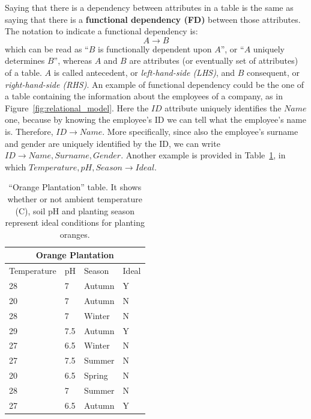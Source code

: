 Saying that there is a dependency between attributes in a table is the same as saying that there is a \textbf{functional dependency (FD)} between those attributes. The notation to indicate a functional dependency is: \[A \rightarrow B\] which can be read as ``\(B\) is functionally dependent upon \(A\)'', or ``\(A\) uniquely determines \(B\)'', whereas \(A\) and \(B\) are attributes (or eventually set of attributes) of a table. \(A\) is called antecedent, or \textit{left-hand-side (LHS)}, and \(B\) consequent, or \textit{right-hand-side (RHS)}. An example of functional dependency could be the one of a table containing the information about the employees of a company, as in Figure~\ref{fig:relational_model}. Here the \(\mathit{ID}\) attribute uniquely identifies the \(\mathit{Name}\) one, because by knowing the employee's ID we can tell what the employee's name is. Therefore, \(\mathit{ID} \rightarrow \mathit{Name}\). More specifically, since also the employee's surname and gender are uniquely identified by the ID, we can write \(\mathit{ID} \rightarrow \mathit{Name}, \mathit{Surname}, \mathit{Gender}\). Another example is provided in Table~\ref{table:orange_plantation}, in which \(\mathit{Temperature}, \mathit{pH}, \mathit{Season} \rightarrow \mathit{Ideal}\).

\begin{table}
\begin{tabular}{|p{2.5cm}|p{2.5cm}|p{2.5cm}|p{2.5cm}|}
\hline
\multicolumn{4}{|c|}{Orange Plantation}\\
\hline
Temperature & pH & Season & Ideal\\
\hline
28 & 7 & Autumn & Y\\
20 & 7 & Autumn & N\\
28 & 7 & Winter & N\\
29 & 7.5 & Autumn & Y\\
27 & 6.5 & Winter & N\\
27 & 7.5 & Summer & N\\
20 & 6.5 & Spring & N\\
28 & 7 & Summer & N\\
27 & 6.5 & Autumn & Y\\
\hline
\end{tabular}
\centering
\caption{``Orange Plantation'' table. It shows whether or not ambient temperature (\textdegree C), soil pH and planting season represent ideal conditions for planting oranges.}
\label{table:orange_plantation}
\end{table}

